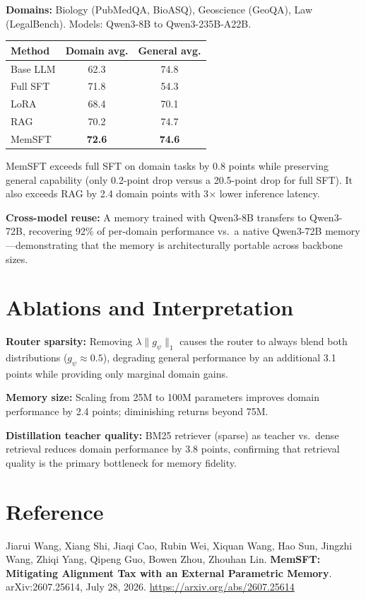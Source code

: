 \documentclass[10pt,twocolumn]{article}
\begin{document}
\textbf{Domains:} Biology (PubMedQA, BioASQ), Geoscience (GeoQA), Law
(LegalBench). Models: Qwen3-8B to Qwen3-235B-A22B.

\begin{center}\small
\begin{tabular}{lcc}
\toprule
Method & Domain avg. & General avg. \\
\midrule
Base LLM & 62.3 & 74.8 \\
Full SFT & 71.8 & 54.3 \\
LoRA & 68.4 & 70.1 \\
RAG & 70.2 & 74.7 \\
MemSFT & \textbf{72.6} & \textbf{74.6} \\
\bottomrule
\end{tabular}
\end{center}

MemSFT exceeds full SFT on domain tasks by 0.8 points while preserving
general capability (only 0.2-point drop versus a 20.5-point drop for
full SFT). It also exceeds RAG by 2.4 domain points with 3$\times$ lower
inference latency.

\textbf{Cross-model reuse:} A memory trained with Qwen3-8B transfers to
Qwen3-72B, recovering 92\% of per-domain performance vs.\ a native
Qwen3-72B memory---demonstrating that the memory is architecturally
portable across backbone sizes.

\section{Ablations and Interpretation}

\textbf{Router sparsity:} Removing $\lambda\|g_\psi\|_1$ causes the router
to always blend both distributions ($g_\psi \approx 0.5$), degrading general
performance by an additional 3.1 points while providing only marginal domain
gains.

\textbf{Memory size:} Scaling from 25M to 100M parameters improves domain
performance by 2.4 points; diminishing returns beyond 75M.

\textbf{Distillation teacher quality:} BM25 retriever (sparse) as teacher
vs.\ dense retrieval reduces domain performance by 3.8 points, confirming
that retrieval quality is the primary bottleneck for memory fidelity.

\section*{Reference}

Jiarui Wang, Xiang Shi, Jiaqi Cao, Rubin Wei, Xiquan Wang, Hao Sun,
Jingzhi Wang, Zhiqi Yang, Qipeng Guo, Bowen Zhou, Zhouhan Lin.
\textbf{MemSFT: Mitigating Alignment Tax with an External Parametric
Memory}.
arXiv:2607.25614, July 28, 2026.
\url{https://arxiv.org/abs/2607.25614}
\end{document}
